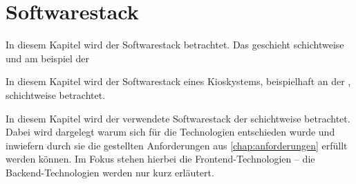 \chapter{Softwarestack}
\label{chap:softwarestack}

In diesem Kapitel wird der Softwarestack betrachtet. Das geschieht 
schichtweise und am beispiel der \shst{}

In diesem Kapitel wird der Softwarestack eines Kioskystems, beispielhaft
an der \shst{}, schichtweise betrachtet. 

In diesem Kapitel wird der verwendete Softwarestack der \shst{} schichtweise
betrachtet. Dabei wird dargelegt warum sich für die Technologien entschieden
wurde und inwiefern durch sie die gestellten Anforderungen aus \autoref{chap:anforderungen}
erfüllt werden können. Im Fokus stehen hierbei die Frontend-Technologien -- die
Backend-Technologien werden nur kurz erläutert.


